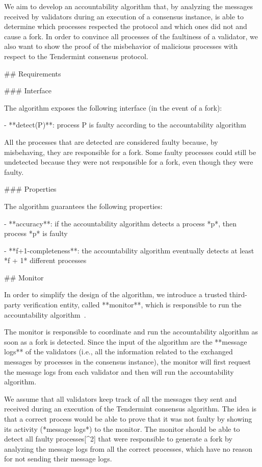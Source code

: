 \documentclass[a4paper,11pt,oneside]{report}
\begin{document}
\begin{markdown}

We aim to develop an accountability algorithm that, by analyzing the messages received by validators during an execution of a consensus instance, is able to determine which processes respected the protocol and which ones did not and cause a fork. 
In order to convince all processes of the faultiness of a validator, we also want to show the proof of the misbehavior of malicious processes with respect to the Tendermint consensus protocol.


## Requirements

### Interface

The algorithm exposes the following interface (in the event of a fork):

- **detect(P)**: process P is faulty according to the accountability algorithm

All the processes that are detected are considered faulty because, by misbehaving, they are responsible for a fork. Some faulty processes could still be undetected because they were not responsible for a fork, even though they were faulty.

### Properties

The algorithm guarantees the following properties:

- **accuracy**: if the accountability algorithm detects a process *p*, then process *p* is faulty

- **f+1-completeness**: the accountability algorithm eventually detects at least *f + 1* different processes

## Monitor

In order to simplify the design of the algorithm, we introduce a trusted third-party verification entity, called **monitor**, which is responsible to run the accountability algorithm~\cite{fork-accountability-specs}.

The monitor is responsible to coordinate and run the accountability algorithm as soon as a fork is detected. Since the input of the algorithm are the **message logs** of the validators (i.e., all the information related to the exchanged messages by processes in the consensus instance), the monitor will first request the message logs from each validator and then will run the accountability algorithm.

We assume that all validators keep track of all the messages they sent and received during an execution of the Tendermint consensus algorithm. 
The idea is that a correct process would be able to prove that it was not faulty by showing its activity (*message logs*) to the monitor.
The monitor should be able to detect all faulty processes[^2] that were responsible to generate a fork by analyzing the message logs from all the correct processes, which have no reason for not sending their message logs.


\end{markdown}
\end{document}
